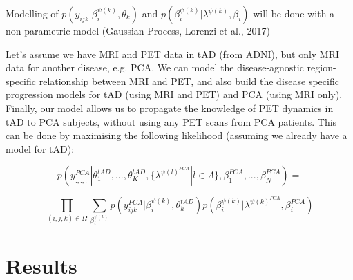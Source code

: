 \documentclass{llncs}
\begin{document}
Modelling of $p(y_{ijk}| \beta_i^{\psi(k)}, \theta_k)$ and $p(\beta_i^{\psi(k)}| \lambda^{\psi(k)}, \beta_i)$ will be done with a non-parametric model (Gaussian Process, Lorenzi et al., 2017)


Let's assume we have MRI and PET data in tAD (from ADNI), but only MRI data for another disease, e.g. PCA. We can model the disease-agnostic region-specific relationship between MRI and PET, and also build the disease specific progression models for tAD (using MRI and PET) and PCA (using MRI only). Finally, our model allows us to propagate the knowledge of PET dynamics in tAD to PCA subjects, without using any PET scans from PCA patients. This can be done by maximising the following likelihood (assuming we already have a model for tAD):

\begin{equation}
 p(y_{.,.,.}^{PCA}|\theta_1^{tAD}, ..., \theta_K^{tAD}, \{\lambda^{\psi(l)^{PCA}} | l \in \Lambda \}, \beta_1^{PCA}, ..., \beta_N^{PCA}) = 
\end{equation}

 \begin{equation}
 \prod_{(i,j,k) \in \Omega} \sum_{\beta_i^{\psi(k)}} p(y_{ijk}^{PCA}| \beta_i^{\psi(k)}, \theta_k^{tAD}) p(\beta_i^{\psi(k)}| \lambda^{\psi(k)^{PCA}}, \beta_i^{PCA})
\end{equation}

\section{Results}
\end{document}
